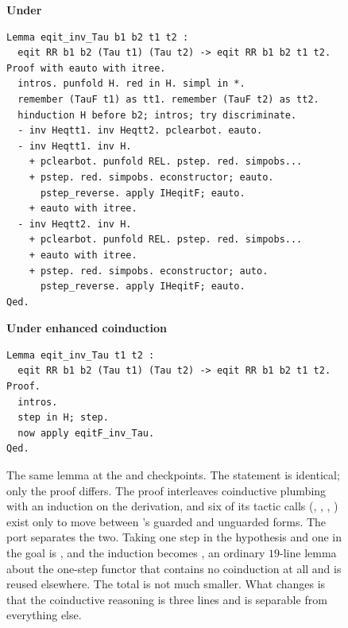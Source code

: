 \begin{figure}[t]
\small
\textbf{Under \paco{}}
\begin{lstlisting}
Lemma eqit_inv_Tau b1 b2 t1 t2 :
  eqit RR b1 b2 (Tau t1) (Tau t2) -> eqit RR b1 b2 t1 t2.
Proof with eauto with itree.
  intros. punfold H. red in H. simpl in *.
  remember (TauF t1) as tt1. remember (TauF t2) as tt2.
  hinduction H before b2; intros; try discriminate.
  - inv Heqtt1. inv Heqtt2. pclearbot. eauto.
  - inv Heqtt1. inv H.
    + pclearbot. punfold REL. pstep. red. simpobs...
    + pstep. red. simpobs. econstructor; eauto.
      pstep_reverse. apply IHeqitF; eauto.
    + eauto with itree.
  - inv Heqtt2. inv H.
    + pclearbot. punfold REL. pstep. red. simpobs...
    + eauto with itree.
    + pstep. red. simpobs. econstructor; auto.
      pstep_reverse. apply IHeqitF; eauto.
Qed.
\end{lstlisting}

\vspace{0.4em}
\textbf{Under enhanced coinduction}
\begin{lstlisting}
Lemma eqit_inv_Tau t1 t2 :
  eqit RR b1 b2 (Tau t1) (Tau t2) -> eqit RR b1 b2 t1 t2.
Proof.
  intros.
  step in H; step.
  now apply eqitF_inv_Tau.
Qed.
\end{lstlisting}
\caption{The same lemma at the \cpaco{} and \cnew{} checkpoints. The statement is
identical; only the proof differs. The \paco{} proof interleaves coinductive
plumbing with an induction on the derivation, and six of its tactic calls
(, , , ) exist only
to move between \paco{}'s guarded and unguarded forms. The port separates the
two. Taking one step in the hypothesis and one in the goal is , and the induction becomes , an ordinary $19$-line
lemma about the one-step functor that contains no coinduction at all and is
reused elsewhere. The total is not much smaller. What changes is that the
coinductive reasoning is three lines and is separable from everything else.}
\label{fig:example}
\end{figure}

